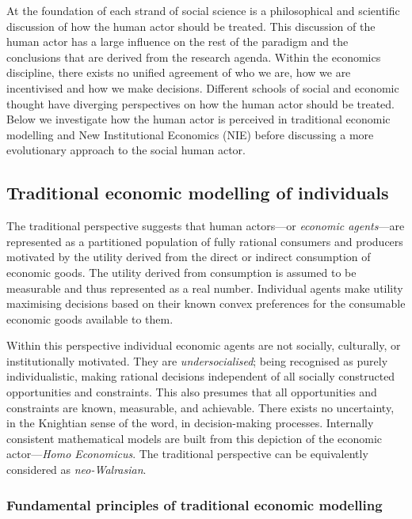At the foundation of each strand of social science is a philosophical and scientific discussion of how the human actor should be treated. This discussion of the human actor has a large influence on the rest of the paradigm and the conclusions that are derived from the research agenda. Within the economics discipline, there exists no unified agreement of who we are, how we are incentivised and how we make decisions. Different schools of social and economic thought have diverging perspectives on how the human actor should be treated. Below we investigate how the human actor is perceived in traditional economic modelling and New Institutional Economics (NIE) before discussing a more evolutionary approach to the social human actor.

\subsection{Traditional economic modelling of individuals}

The traditional perspective suggests that human actors---or \emph{economic agents}---are represented as a partitioned population of fully rational consumers and producers motivated by the utility derived from the direct or indirect consumption of economic goods. The utility derived from consumption is assumed to be measurable and thus represented as a real number. Individual agents make utility maximising decisions based on their known convex preferences for the consumable economic goods available to them. 

Within this perspective individual economic agents are not socially, culturally, or institutionally motivated. They are \emph{undersocialised}; being recognised as purely individualistic, making rational decisions independent of all socially constructed opportunities and constraints. This also presumes that all opportunities and constraints are known, measurable, and achievable. There exists no uncertainty, in the Knightian sense of the word, in decision-making processes. Internally consistent mathematical models are built from this depiction of the economic actor---\emph{Homo Economicus}. The traditional perspective can be equivalently considered as \emph{neo-Walrasian}.

\subsubsection{Fundamental principles of traditional economic modelling}

